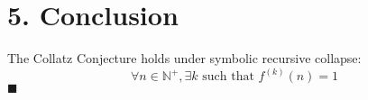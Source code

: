 \documentclass{article}
\begin{document}
\section*{5. Conclusion}
The Collatz Conjecture holds under symbolic recursive collapse:
\[
\forall n \in \mathbb{N}^+, \exists k \text{ such that } f^{(k)}(n) = 1
\]
\(\blacksquare\)
\end{document}
